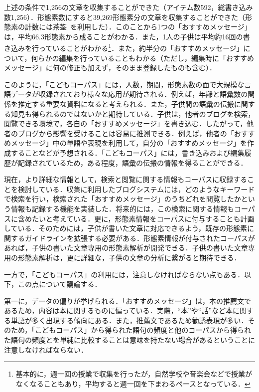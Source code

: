 \documentclass[japanese]{jnlp_1.4}
\begin{document}
  
  上述の条件で1,256の文章を収集することができた（アイテム数592，総書き込み数1,256）．形態素数にすると39,269形態素分の文章を収集することができた（形態素の計数には茶筌~\cite{matsumoto}を利用した）．このことから1つの「おすすめメッセージ」は，平均66.3形態素から成ることがわかる．また，1人の子供は平均約16回の書き込みを行っていることがわかる\footnote{基本的に，週一回の授業で収集を行ったが，自然学校や音楽会などで授業がなくなることもあり，平均すると週一回を下まわるペースとなっている．}．また，約半分の「おすすめメッセージ」について，何らかの編集を行っていることもわかる（ただし，編集時に「おすすめメッセージ」に何の修正も加えず，そのまま登録したものも含む）．


  このように，「こどもコーパス」には，人数，期間，形態素数の面で大規模な言語データが収録されており様々な応用が期待される．例えば，年齢と語彙数の関係を推定する重要な資料になると考えられる．また，子供間の語彙の伝搬に関する知見も得られるのではないかと期待している．子供は，他者のブログを検索，閲覧できる環境で，各自の「おすすめメッセージ」を書き込む．したがって，他者のブログから影響を受けることは容易に推測できる．例えば，他者の「おすすめメッセージ」中の単語や表現を利用して，自分の「おすすめメッセージ」を作成することなどが予想される．「こどもコーパス」には，書き込みおよび編集履歴が記録されているため，ある程度，語彙の伝搬の情報を得ることができる．


  現在，より詳細な情報として，検索と閲覧に関する情報もコーパスに収録することを検討している．収集に利用したブログシステムには，どのようなキーワードで検索を行い，検索された「おすすめメッセージ」のうちどれを閲覧したかという情報も記録する機能を実装した．将来的には，この検索に関する情報もコーパスに含めたいと考えている．更に，形態素情報をコーパスに付与することも計画している．そのためには，子供が書いた文章に対応できるよう，既存の形態素に関するガイドラインを拡張する必要がある．形態素情報が付与されたコーパスがあれば，子供の書いた文章専用の形態素解析が開発できる．子供の書いた文章専用の形態素解析は，更に詳細な，子供の文章の分析に繋がると期待できる．


  一方で，「こどもコーパス」の利用には，注意しなければならない点もある．以下，この点について議論する．


  第一に，データの偏りが挙げられる．「おすすめメッセージ」は，本の推薦文であるため，内容は本に関するものに偏っている．実際，``本''や``話''など本に関する単語が多く出現する傾向にある．また，推薦文であるため勧誘表現が多い．そのため，「こどもコーパス」から得られた語句の頻度と他のコーパスから得られた語句の頻度とを単純に比較することは意味を持たない場合があるということに注意しなければならない．
\end{document}
